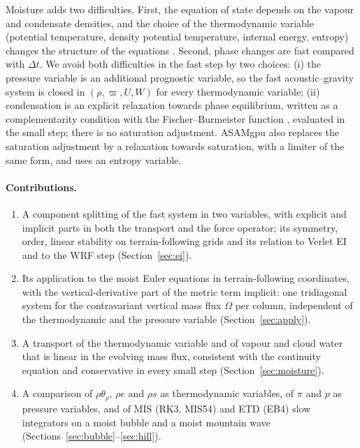 \documentclass[11pt,a4paper]{article}
\newcommand{\dt}{\Delta t}
\newcommand{\pv}{\varpi}      %
\begin{document}
Moisture adds two difficulties. First, the equation of state depends on the vapour and condensate
densities, and the choice of the thermodynamic variable (potential temperature, density potential
temperature, internal energy, entropy) changes the structure of the equations
\cite{satoh,thuburn,horn,ooyama,marquet}. Second, phase changes are fast compared with $\dt$. We avoid both difficulties
in the fast step by two choices: (i) the pressure variable is an additional prognostic variable, so
the fast acoustic--gravity system is closed in $(\rho,\pv,U,W)$ for every thermodynamic variable;
(ii) condensation is an explicit relaxation towards phase equilibrium, written as a
complementarity condition with the Fischer--Burmeister function \cite{fischer}, evaluated in the
small step; there is no saturation adjustment. ASAMgpu \cite{horn} also replaces the saturation adjustment by a relaxation
towards saturation, with a limiter of the same form, and uses an entropy variable.

\paragraph{Contributions.}
\begin{enumerate}
\item A component splitting of the fast system in two variables, with explicit and implicit parts in
both the transport and the force operator; its symmetry, order, linear stability on terrain-following
grids and its relation to Verlet EI and to the WRF step (Section~\ref{sec:ei}).
\item Its application to the moist Euler equations in terrain-following coordinates, with the
vertical-derivative part of the metric term implicit: one tridiagonal system for the contravariant
vertical mass flux $\Omega$ per column, independent of the thermodynamic and the pressure variable
(Section~\ref{sec:apply}).
\item A transport of the thermodynamic variable and of vapour and cloud water that is linear in the
evolving mass flux, consistent with the continuity equation and conservative in every small step
(Section~\ref{sec:moisture}).
\item A comparison of $\rho\theta_\rho$, $\rho e$ and $\rho s$ as thermodynamic variables, of $\pi$ and $p$ as
pressure variables, and of MIS (RK3, MIS54) and ETD (EB4) slow integrators on a moist bubble
\cite{bryanfritsch} and a moist mountain wave \cite{durranklemp83}
(Sections~\ref{sec:bubble}--\ref{sec:hill}).
\end{enumerate}
\end{document}
